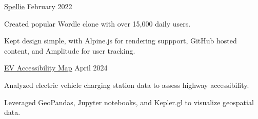 
\vspace{-0.3cm}


\begin{cventries}

  \cventry
    {\href{https://spelliegame.com/}{Spellie}} %
    {}
    {}
    {February 2022}
    {
      \begin{cvitems} %
        \item{Created popular Wordle clone with over 15,000 daily users.}
        \item{Kept design simple, with Alpine.js for rendering suppport, GitHub hosted content, and Amplitude for user tracking.}
      \end{cvitems}
    }

  \cventry
    {\href{https://github.com/canadianveggie/ev-map}{EV Accessibility Map}} %
    {}
    {}
    {April 2024}
    {
      \begin{cvitems} %
        \item{Analyzed electric vehicle charging station data to assess highway accessibility.}
        \item{Leveraged GeoPandas, Jupyter notebooks, and Kepler.gl to visualize geospatial data.}
      \end{cvitems}
    }

\end{cventries}

\vspace{0.3cm}
